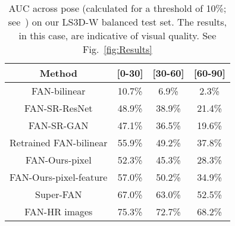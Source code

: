 \documentclass[10pt,twocolumn,letterpaper]{article}
\begin{document}
\begin{table}
\begin{center}
\caption{AUC across pose (calculated for a threshold of
10\%; see~\cite{Bulat2017How}) on our LS3D-W balanced test set. The results,
in this case, are indicative of visual quality. See Fig.~\ref{fig:Results}}
\begin{tabular}{cccc}
\toprule
Method & [0-30] & [30-60] & [60-90] \\
\midrule
FAN-bilinear & 10.7\% & 6.9\% & 2.3\% \\
FAN-SR-ResNet & 48.9\% & 38.9\% & 21.4\% \\
FAN-SR-GAN & 47.1\% & 36.5\% & 19.6\%  \\
Retrained FAN-bilinear & 55.9\% & 49.2\% & 37.8\% \\
FAN-Ours-pixel & 52.3\% & 45.3\% & 28.3\% \\
FAN-Ours-pixel-feature & 57.0\% & 50.2\% & 34.9\% \\
Super-FAN & 67.0\% & 63.0\% & 52.5\% \\
FAN-HR images & 75.3\% & 72.7\% & 68.2\% \\ 
\bottomrule
\end{tabular}
\label{Tab:Experiment}
\end{center}
\end{table}


{\small


}
\end{document}
